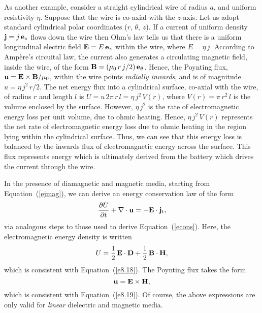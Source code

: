 As another example, consider a straight cylindrical wire of radius $a$, and
uniform resistivity $\eta$. Suppose that the wire is co-axial with the $z$-axis.
Let us adopt standard cylindrical polar coordinates ($r$, $\theta$, $z$). 
If a current of uniform density ${\bf j} = j\,{\bf e}_z$ flows down the
wire then Ohm's law tells us that there is a uniform longitudinal
electric field ${\bf E} = E\,{\bf e}_z$ within the wire, where $E=\eta\,j$. 
According to Amp\`{e}re's circuital law, the current also generates a circulating magnetic field, inside the wire, of the form
${\bf B} = (\mu_0\,r\,j/2)\,{\bf e}_\theta$. Hence, the Poynting flux, ${\bf u} = {\bf E}\times {\bf B}/\mu_0$, within the wire points {\em radially inwards}, and is of magnitude $u= \eta\,j^2\,r/2$. The net energy flux
into a cylindrical surface, co-axial with the wire, of radius $r$ and length $l$ is $U = u\,2\pi\,r\,l=\eta\,j^2\,V(r)$, where $V(r)=\pi\,r^2\,l$ is the volume enclosed by the surface.
However, $\eta\,j^2$ is the rate of electromagnetic energy loss per unit
volume, due to ohmic heating. Hence, $\eta\,j^2\,V(r)$ represents the net rate
of electromagnetic energy loss due to ohmic heating in the region lying within the cylindrical
surface. Thus, we can see that this energy loss is balanced by the inwards flux
of electromagnetic energy across the surface. This flux represents energy which is ultimately derived from the battery which drives the current through
the wire.

In the presence of diamagnetic and magnetic media, starting from 
Equation~(\ref{ejmag}), we can derive an energy conservation law
of the form 
\begin{equation}
\frac{\partial U}{\partial t} + \nabla\cdot{\bf u} = -{\bf E}\cdot {\bf j}_t,
\end{equation}
via analogous steps to those used to derive Equation~(\ref{econs}). Here,
the electromagnetic energy density is written
\begin{equation}
U = \frac{1}{2}\,{\bf E}\cdot{\bf D} + \frac{1}{2}\,{\bf B}\cdot{\bf H},
\end{equation}
which is consistent with Equation~(\ref{e8.18}). The Poynting
flux takes the form
\begin{equation}
{\bf u} = {\bf E}\times{\bf H},
\end{equation}
which is consistent with Equation~(\ref{e8.19}). Of course, the above expressions
are only valid for {\em linear} dielectric and magnetic media.


